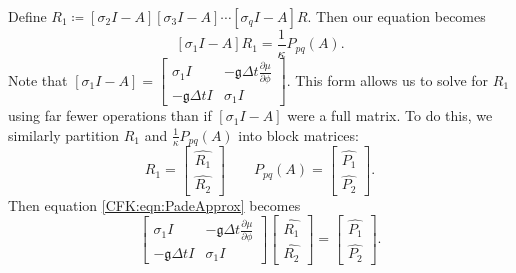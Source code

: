 \documentclass{csri19}
\newcommand{\CFKg}{\mathfrak{g}}
\begin{document}
Define $R_1 \coloneqq \left[\sigma_2I-A\right]\left[\sigma_3I-A\right]
\cdots\left[\sigma_qI-A\right]R$. Then our equation becomes
\begin{equation}\label{CFK:eqn:PadeApprox} \left[\sigma_1I-A\right]R_1 
= \frac{1}{\kappa}P_{pq}(A).\end{equation} Note that
$\left[\sigma_1I-A\right] =
 \begin{bmatrix} \sigma_1 I  & -\CFKg\Delta t \frac{\partial\mu}{\partial\phi} \\
 -\CFKg\Delta t I            & \sigma_1 I \end{bmatrix}.$ This form allows 
us to solve for $R_1$ using far fewer operations than if 
$\left[\sigma_1I-A\right]$ were a full matrix. To do this, we similarly 
partition $R_1$ and $\frac{1}{\kappa}P_{pq}(A)$ into block matrices:
\[ R_1 = \begin{bmatrix} \hat{R_1} \\ \hat{R_2}\end{bmatrix} \qquad P_{pq}(A) = \begin{bmatrix} \hat{P_1} \\ \hat{P_2}\end{bmatrix}.\]
Then equation \ref{CFK:eqn:PadeApprox} becomes
\[\begin{bmatrix} \sigma_1 I  & -\CFKg\Delta t \frac{\partial\mu}{\partial\phi} \\
           -\CFKg\Delta t I & \sigma_1 I \end{bmatrix}
\begin{bmatrix} \hat{R_1} \\
 \hat{R_2} \end{bmatrix} = 
\begin{bmatrix} \hat{P_1} \\
 \hat{P_2} \end{bmatrix}.\]
\end{document}
